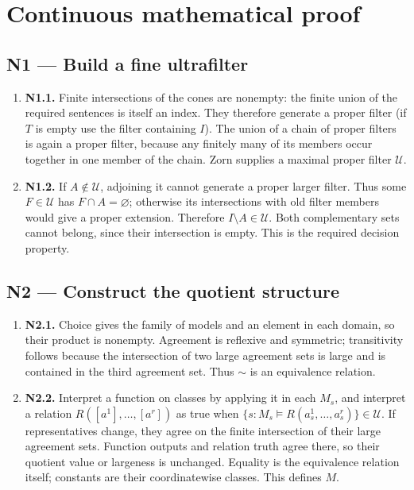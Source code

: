 \documentclass[preprint,12pt,aps,pra,showkeys,amsmath,amssymb,superscriptaddress,floatfix]{revtex4-2}
\theoremstyle{definition}
\theoremstyle{remark}
\begin{document}
\endgroup\clearpage\section{Continuous mathematical proof}\label{sec:proof}

\subsection{N1 --- Build a fine
ultrafilter}\label{n1-build-a-fine-ultrafilter}

\begin{enumerate}
\def\labelenumi{\arabic{enumi}.}
\item
  \textbf{N1.1.} Finite intersections of the cones are nonempty: the
  finite union of the required sentences is itself an index. They
  therefore generate a proper filter (if \(T\) is empty use the filter
  containing \(I\)). The union of a chain of proper filters is again a
  proper filter, because any finitely many of its members occur together
  in one member of the chain. Zorn supplies a maximal proper filter
  \(\mathcal U\).
\item
  \textbf{N1.2.} If \(A\notin\mathcal U\), adjoining it cannot generate
  a proper larger filter. Thus some \(F\in\mathcal U\) has
  \(F\cap A=\varnothing\); otherwise its intersections with old filter
  members would give a proper extension. Therefore
  \(I\setminus A\in\mathcal U\). Both complementary sets cannot belong,
  since their intersection is empty. This is the required decision
  property.
\end{enumerate}

\subsection{N2 --- Construct the quotient
structure}\label{n2-construct-the-quotient-structure}

\begin{enumerate}
\def\labelenumi{\arabic{enumi}.}
\item
  \textbf{N2.1.} Choice gives the family of models and an element in
  each domain, so their product is nonempty. Agreement is reflexive and
  symmetric; transitivity follows because the intersection of two large
  agreement sets is large and is contained in the third agreement set.
  Thus \(\sim\) is an equivalence relation.
\item
  \textbf{N2.2.} Interpret a function on classes by applying it in each
  \(M_s\), and interpret a relation \(R([a^1],\ldots,[a^r])\) as true
  when \(\{s:M_s\models R(a_s^1,\ldots,a_s^r)\}\in\mathcal U\). If
  representatives change, they agree on the finite intersection of their
  large agreement sets. Function outputs and relation truth agree there,
  so their quotient value or largeness is unchanged. Equality is the
  equivalence relation itself; constants are their coordinatewise
  classes. This defines \(M\).
\end{enumerate}
\end{document}

